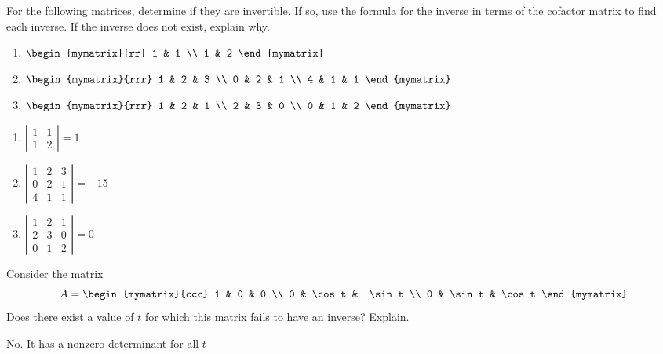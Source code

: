 \begin{enumialphparenastyle}
\begin{ex} For the following matrices, determine if they are invertible. If so, use the formula for the inverse in terms of the cofactor matrix to
find each inverse. If the inverse does not exist, explain why. 
\begin{enumerate}
\item
$\begin{mymatrix}{rr}
1 & 1 \\
1 & 2
\end{mymatrix}$
\item
$\begin{mymatrix}{rrr}
1 & 2 & 3 \\
0 & 2 & 1 \\
4 & 1 & 1
\end{mymatrix}$
\item
$\begin{mymatrix}{rrr}
1 & 2 & 1 \\
2 & 3 & 0 \\
0 & 1 & 2
\end{mymatrix} $
\end{enumerate}
\begin{sol}
\begin{enumerate}
\item $\left\vert
\begin{array}{cc}
1 & 1 \\
1 & 2
\end{array}
\right\vert = 1$
\item $\left\vert
\begin{array}{ccc}
1 & 2 & 3 \\
0 & 2 & 1 \\
4 & 1 & 1%
\end{array}
\right\vert = -15$
\item $\left\vert
\begin{array}{ccc}
1 & 2 & 1 \\
2 & 3 & 0 \\
0 & 1 & 2
\end{array}
\right\vert = 0$
\end{enumerate}
\end{sol}
\end{ex}

\begin{ex} Consider the matrix 
\begin{equation*}
A = 
\begin{mymatrix}{ccc}
1 & 0 & 0 \\
0 & \cos t & -\sin t \\
0 & \sin t & \cos t
\end{mymatrix}
\end{equation*}
Does there exist a value of $t$ for which this matrix fails to have an
inverse? Explain.
\begin{sol}
 No. It has a nonzero determinant for all $t$
\end{sol}
\end{ex}



\end{enumialphparenastyle}
